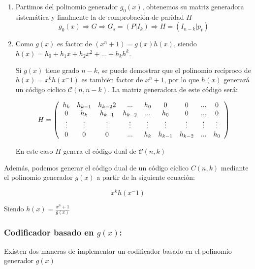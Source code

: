 \documentclass{article}
\begin{document}
\begin{enumerate}
    \item Partimos del polinomio generador $g_0(x)$, obtenemos su matriz generadora sistemática y finalmente la de comprobación de paridad $H$
    \begin{equation}
        g_0(x) \Rightarrow G \Rightarrow G_s = (P|I_k) \Rightarrow H=(I_{n-k}|p_t)
    \end{equation}
    \item Como $g(x)$ es factor de  $(x^n+1)=g(x)h(x)$, siendo $h(x) = h_0 + h_1x + h_2x^2+...+h_kh^k$.
    
    Si $g(x)$ tiene grado $n-k$, se puede demostrar que el polinomio recíproco de $h(x) = x^kh(x^-1)$ es también factor de $x^n+1$, por lo que $h(x)$ generará un código cíclico $\mathcal{C}(n, n-k)$. La matriz generadora de este código será:
 
    \begin{equation}
        H = 
        \left(
        \begin{array}{c c c c c c c c c}
            h_k & h_{k-1} & h_{k-2}2 & ... & h_0 & 0 & 0 & ... & 0 \\
            0 & h_k & h_{k-1} & h_{k-2} & ...  & h_{0} & 0 & ... & 0 \\
            \vdots & \vdots & \vdots & \vdots & \vdots & \vdots & \vdots & \vdots & \vdots \\
            0 & 0 & 0 & ... & h_k & h_{k-1} & h_{k-2} & ... & h_{0} \\
        \end{array}
        \right)
    \end{equation}

    En este caso $H$ genera el código dual de $\mathcal{C}(n,k)$
\end{enumerate}

Además, podemos generar el código dual de un código cíclico $C(n,k)$ mediante el polinomio generador $g(x)$ a partir de la siguiente ecuación:

\begin{equation}
    x^kh(x^-1)
\end{equation}

Siendo $h(x)=\frac{x^n+1}{g(x)}$

\subsubsection{Codificador basado en $g(x)$:}

Existen dos maneras de implementar un codificador basado en el polinomio generador $g(x)$
\end{document}
